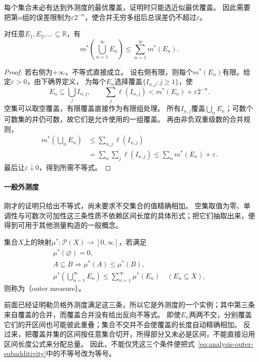 每个集合未必有达到外测度的最优覆盖，证明时只能选近似最优覆盖。
因此需要把第$n$组的误差限制为$\varepsilon2^{-n}$，使合并无穷多组后总误差仍不超过$\varepsilon$。
\begin{theorem}[勒贝格外测度的可数次可加性]
\label{thm:analysis-outer-subadditivity}
对任意$E_1,E_2,\ldots\subseteq\mathbb R$，有
\begin{equation}
 m^*\left(\bigcup_{n=1}^{\infty}E_n\right)
 \leq\sum_{n=1}^{\infty}m^*(E_n).
 \label{eq:analysis-outer-subadditivity}
\end{equation}
\end{theorem}
\begin{proof}
若右侧为$+\infty$，不等式直接成立。
设右侧有限，则每个$m^*(E_n)$有限。给定$\varepsilon>0$，由下确界定义，
为每个$E_n$选择覆盖$\{I_{n,j}:j\geq1\}$，使
\[
 E_n\subseteq\bigcup_j I_{n,j},\qquad
 \sum_j\ell(I_{n,j})<m^*(E_n)+\varepsilon2^{-n}.
\]
空集可以取空覆盖，有限覆盖直接作为有限组处理。
所有$I_{n,j}$覆盖$\bigcup_nE_n$；可数个可数集的并仍可数，故它们是允许使用的一组覆盖。
再由非负双重级数的合并规则，
\[
 \begin{aligned}
 m^*\left(\bigcup_nE_n\right)
 &\leq\sum_{n,j}\ell(I_{n,j})\\
 &=\sum_n\sum_j\ell(I_{n,j})
 \leq\sum_nm^*(E_n)+\varepsilon.
 \end{aligned}
\]
最后让$\varepsilon\downarrow0$，得到所需不等式。
\end{proof}

\paragraph{一般外测度}

刚才的证明只给出不等式，尚未要求不交集合的值精确相加。
空集取值为零、单调性与可数次可加性这三条性质不依赖区间长度的具体形式；把它们抽取出来，便得到可用于其他测量构造的一般概念。
\begin{definition}[外测度]
\label{def:analysis-outer-measure}
集合$X$上的映射$\mu^*:\mathcal P(X)\to[0,\infty]$，若满足
\[
 \begin{gathered}
 \mu^*(\varnothing)=0,\\
 A\subseteq B\Longrightarrow\mu^*(A)\leq\mu^*(B),\\
 \mu^*\left(\bigcup_{n=1}^{\infty}E_n\right)\leq\sum_{n=1}^{\infty}\mu^*(E_n)
 \quad(E_n\subseteq X),
 \end{gathered}
\]
则称为（outer measure）。
\end{definition}
前面已经证明勒贝格外测度满足这三条，所以它是外测度的一个实例；其中第三条来自覆盖的合并，而覆盖合并没有给出反向不等式。
即使$E_n$两两不交，分别覆盖它们的开区间也可能彼此重叠；集合不交并不会使覆盖的长度自动精确相加。
反过来，把覆盖并集的区间按任意集合切开，所得部分又未必是区间，不能直接沿用区间长度公式来分配总量。
因此，不能仅凭这三个条件便把式~\eqref{eq:analysis-outer-subadditivity}中的不等号改为等号。

